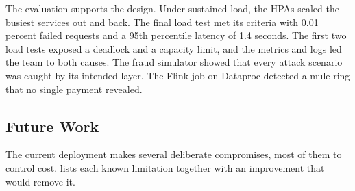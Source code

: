 \documentclass[11pt,a4paper]{article}
\begin{document}
The evaluation supports the design. Under sustained load, the HPAs scaled the busiest services out and back. The final load test met its criteria with 0.01 percent failed requests and a 95th percentile latency of 1.4 seconds. The first two load tests exposed a deadlock and a capacity limit, and the metrics and logs led the team to both causes. The fraud simulator showed that every attack scenario was caught by its intended layer. The Flink job on Dataproc detected a mule ring that no single payment revealed.

\subsection{Future Work}
\label{sec:limitations}

The current deployment makes several deliberate compromises, most of them to control cost.  lists each known limitation together with an improvement that would remove it.
\end{document}
